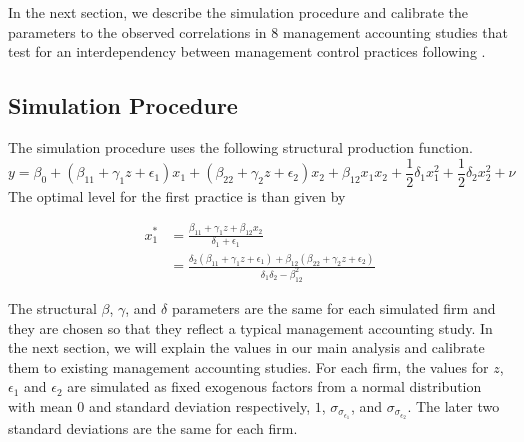 \documentclass[12pt]{article}
\begin{document}
In the next section, we describe the simulation procedure and calibrate the parameters to the observed correlations in 8 management accounting studies that test for an interdependency between management control practices following \citet{Grabner2013}. 

\subsection{Simulation Procedure}

The simulation procedure uses the following structural production function. 
\begin{equation}\label{eq:structural}
y  = \beta_0 + (\beta_{11} + \gamma_1 z + \epsilon_1) x_1 
						+ (\beta_{22} + \gamma_2 z  + \epsilon_2) x_2 
                        + \beta_{12} x_1 x_2 + \frac{1}{2}\delta_1 x^2_1 + \frac{1}{2}\delta_2 x^2_2 + \nu
\end{equation}
The optimal level for the first practice is than given by 
	
\begin{equation}\label{eq:optimal}
\begin{aligned}
x_1^* &= \frac{\beta_11 + \gamma_1 z + \beta_{12} x_2}{\delta_1 + \epsilon_{1} } \\
		   &= \frac{\delta_2 (\beta_{11} + \gamma_1 z + \epsilon_1) 
           					+ \beta_{12} (\beta_{22} + \gamma_2 z + \epsilon_2) }
                            {\delta_1 \delta_2 - \beta_{12}^2}
\end{aligned}
\end{equation}

The structural $\beta$, $\gamma$, and $\delta$ parameters are the same for each simulated firm and they are chosen so that they reflect a typical management accounting study. In the next section, we will explain the values in our main analysis and calibrate them to existing management accounting studies. For each firm, the values for $z$, $\epsilon_1$ and $\epsilon_2$ are simulated as fixed exogenous factors from a normal distribution with mean $0$ and standard deviation respectively, $1$,  $\sigma_{\sigma_{\epsilon_1}}$, and $\sigma_{\sigma_{\epsilon_2}}$. The later two standard deviations are the same for each firm. 
\end{document}
